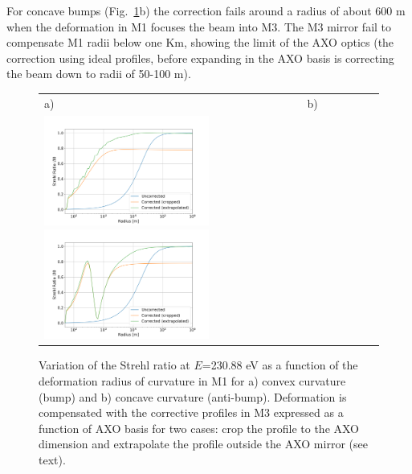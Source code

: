 \documentclass[preprint]{iucr}              %
\newcommand{\todo}[1]{{\color{red}[TODO: "#1'']}}
\begin{document}
For concave bumps (Fig.~\ref{fig:strehlRatioVersusR}b) the correction fails around a radius of about 600 m when the deformation in M1 focuses the beam into M3. The M3 mirror fail to compensate M1 radii below one Km, showing the limit of the AXO optics (the correction using ideal profiles, before expanding in the AXO basis is correcting the beam down to radii of 50-100 m).

 
 

  \begin{figure}
  \label{fig:strehlRatioVersusR} 
  \begin{center}
  \begin{tabular}{l} 
  a)~~~~~~~~~~~~~~~~~~~~~~~~~~~~~~~~~~~~~~~~~~~~~b) \\
  \includegraphics[width=0.5\textwidth]{figures/scan_peak_vs_negative_radius.png}
    \includegraphics[width=0.5\textwidth]{figures/scan_peak_vs_positive_radius.png} 
  
  \end{tabular}
  \end{center}
  \caption{
Variation of the Strehl ratio at $E$=230.88 eV as a function of the deformation radius of curvature in M1 for a) convex curvature (bump) and b) concave curvature (anti-bump). Deformation is compensated with the corrective profiles in M3 expressed as a function of AXO basis for two cases: crop the profile to the AXO dimension and extrapolate the profile outside the AXO mirror (see text).}
  \end{figure} 
\end{document}
